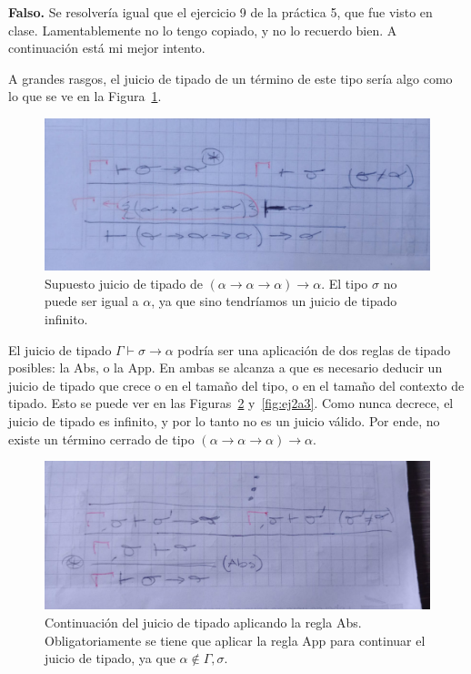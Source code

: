 \documentclass{article}
\begin{document}
\textbf{Falso.} Se resolvería igual que el ejercicio 9 de la práctica 5, que fue visto en clase. Lamentablemente no lo tengo copiado, y no lo recuerdo bien. A continuación está mi mejor intento.

A grandes rasgos, el juicio de tipado de un término de este tipo sería algo como lo que se ve en la Figura~\ref{fig:ej2a1}.

\begin{figure}[htbp]
    \centering
\includegraphics[scale=0.2]{ej2a1.jpeg}
\caption{Supuesto juicio de tipado de $(\alpha \rightarrow \alpha \rightarrow \alpha) \rightarrow \alpha$. El tipo $\sigma$ no puede ser igual a $\alpha$, ya que sino tendríamos un juicio de tipado infinito.}
\label{fig:ej2a1}
\end{figure}

El juicio de tipado $\Gamma \vdash \sigma \rightarrow \alpha$ podría ser una aplicación de dos reglas de tipado posibles: la Abs, o la App. En ambas se alcanza a que es necesario deducir un juicio de tipado que crece o en el tamaño del tipo, o en el tamaño del contexto de tipado. Esto se puede ver en las Figuras~\ref{fig:ej2a2} y~\ref{fig:ej2a3}. Como nunca decrece, el juicio de tipado es infinito, y por lo tanto no es un juicio válido. Por ende, no existe un término cerrado de tipo $(\alpha \rightarrow \alpha \rightarrow \alpha) \rightarrow \alpha$.

\begin{figure}[htbp]
    \centering
\includegraphics[scale=0.2]{ej2a2.jpeg}
\caption{Continuación del juicio de tipado aplicando la regla Abs. Obligatoriamente se tiene que aplicar la regla App para continuar el juicio de tipado, ya que $\alpha \not\in \Gamma, \sigma$.}
\label{fig:ej2a2}
\end{figure}
\end{document}
